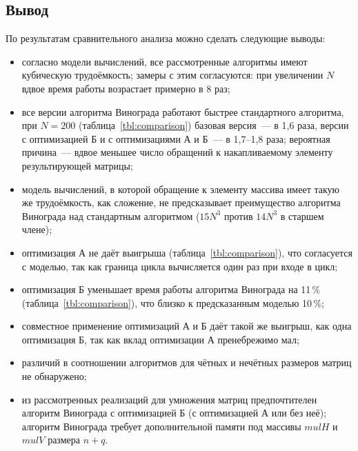 \subsection{Вывод}
По результатам сравнительного анализа можно сделать следующие выводы:
\begin{itemize}
	\item согласно модели вычислений, все рассмотренные алгоритмы имеют кубическую трудоёмкость; замеры с этим согласуются: при увеличении $N$ вдвое время работы возрастает примерно в 8 раз;
	\item все версии алгоритма Винограда работают быстрее стандартного алгоритма, при $N = 200$ (таблица~\ref{tbl:comparison}) базовая версия~--- в 1,6 раза, версии с оптимизацией Б и с оптимизациями А и Б~--- в 1,7--1,8 раза; вероятная причина~--- вдвое меньшее число обращений к накапливаемому элементу результирующей матрицы;
	\item модель вычислений, в которой обращение к элементу массива имеет такую же трудоёмкость, как сложение, не предсказывает преимущество алгоритма Винограда над стандартным алгоритмом ($15N^3$ против $14N^3$ в старшем члене);
	\item оптимизация А не даёт выигрыша (таблица~\ref{tbl:comparison}), что согласуется с моделью, так как граница цикла вычисляется один раз при входе в цикл;
	\item оптимизация Б уменьшает время работы алгоритма Винограда на 11\,\% (таблица~\ref{tbl:comparison}), что близко к предсказанным моделью 10\,\%;
	\item совместное применение оптимизаций А и Б даёт такой же выигрыш, как одна оптимизация Б, так как вклад оптимизации А пренебрежимо мал;
	\item различий в соотношении алгоритмов для чётных и нечётных размеров матриц не обнаружено;
	\item из рассмотренных реализаций для умножения матриц предпочтителен алгоритм Винограда с оптимизацией Б (с оптимизацией А или без неё); алгоритм Винограда требует дополнительной памяти под массивы $mulH$ и $mulV$ размера $n + q$.
\end{itemize}
